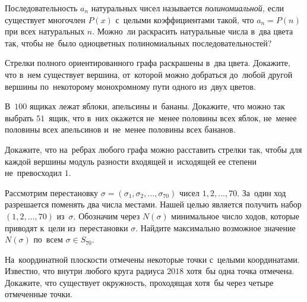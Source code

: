 


\begin{problems}

\item
Последовательность $a_{n}$ натуральных чисел называется \emph{полиномиальной,}
если существует многочлен $P(x)$ с~целыми коэффициентами такой, что
$a_{n} = P(n)$ при всех натуральных $n$.
Можно~ли раскрасить натуральные числа в~два цвета так, чтобы не~было
одноцветных полиномиальных последовательностей?

\item
Стрелки полного ориентированного графа раскрашены в~два цвета.
Докажите, что в~нем существует вершина, от~которой можно добраться до~любой
другой вершины по~некоторому монохромному пути одного из~двух цветов.

\item
В~$100$ ящиках лежат яблоки, апельсины и~бананы.
Докажите, что можно так выбрать $51$~ящик, что в~них окажется не~менее половины
всех яблок, не~менее половины всех апельсинов и~не~менее половины всех бананов.

\item
Докажите, что на~ребрах любого графа можно расставить стрелки так, чтобы для
каждой вершины модуль разности входящей и~исходящей ее степени
не~превосходил $1$.

\item
Рассмотрим перестановку
$\sigma = (\sigma_{1}, \sigma_{2}, \ldots, \sigma_{70})$
чисел $1, 2, \ldots, 70$.
За~один ход разрешается поменять два числа местами.
Нашей целью является получить набор $(1, 2, \ldots, 70)$
из~$\sigma$.
Обозначим через $N({\sigma})$ минимальное число ходов, которые приводят к~цели
из~перестановки $\sigma$.
Найдите максимально возможное значение $N({\sigma})$ по~всем
$\sigma \in S_{70}$.

\item
На~координатной плоскости отмечены некоторые точки с~целыми координатами.
Известно, что внутри любого круга радиуса $2018$ хотя~бы одна точка отмечена.
Докажите, что существует окружность, проходящая хотя~бы через четыре отмеченные
точки.

\end{problems}

